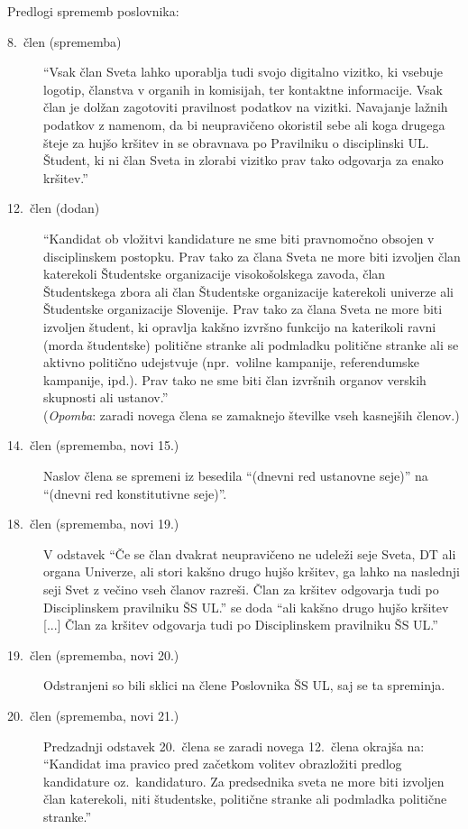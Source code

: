 \documentclass{seja}
\begin{document}
\begin{ad}
\item Predlogi sprememb poslovnika:
\begin{description}
  \item[8.~člen (sprememba)] ``Vsak član Sveta lahko uporablja tudi svojo
  digitalno vizitko, ki vsebuje logotip, članstva v organih in komisijah, ter
  kontaktne informacije. Vsak član je dolžan zagotoviti pravilnost podatkov na
  vizitki. Navajanje lažnih podatkov z namenom, da bi neupravičeno okoristil sebe
  ali koga drugega šteje za hujšo kršitev in se obravnava po Pravilniku o
  disciplinski UL. Študent, ki ni član Sveta in zlorabi vizitko prav tako
  odgovarja za enako kršitev.''
  \item[12.~člen (dodan)] ``Kandidat ob vložitvi kandidature ne sme biti pravnomočno
  obsojen v disciplinskem postopku. Prav tako za člana Sveta ne more biti izvoljen član
  katerekoli Študentske organizacije visokošolskega zavoda, član Študentskega
  zbora ali član Študentske organizacije katerekoli univerze ali Študentske
  organizacije Slovenije. Prav tako za člana Sveta ne more biti izvoljen študent,
  ki opravlja kakšno izvršno funkcijo na katerikoli ravni (morda študentske) politične
  stranke ali podmladku politične stranke ali se aktivno politično udejstvuje
  (npr.~volilne kampanije, referendumske kampanije, ipd.).
  Prav tako ne sme biti član izvršnih organov verskih skupnosti ali ustanov.'' \\
  (\emph{Opomba}: zaradi novega člena se zamaknejo številke vseh kasnejših členov.)
  \item[14.~člen (sprememba, novi 15.)] Naslov člena se spremeni iz besedila
  ``(dnevni red ustanovne seje)'' na ``(dnevni red konstitutivne seje)''.
  \item[18.~člen (sprememba, novi 19.)] V odstavek ``Če se član dvakrat
  neupravičeno ne udeleži seje Sveta, DT ali organa Univerze, ali stori kakšno
  drugo hujšo kršitev, ga lahko na naslednji seji Svet z večino vseh članov
  razreši. Član za kršitev odgovarja tudi po Disciplinskem pravilniku ŠS UL.'' se
  doda ``ali kakšno drugo hujšo kršitev [...] Član za kršitev odgovarja tudi po
  Disciplinskem pravilniku ŠS UL.''
  \item[19.~člen (sprememba, novi 20.)] Odstranjeni so bili sklici na člene
  Poslovnika ŠS UL, saj se ta spreminja.
  \item[20.~člen (sprememba, novi 21.)] Predzadnji odstavek 20.~člena se zaradi
  novega 12.~člena okrajša na: ``Kandidat ima pravico pred začetkom volitev
  obrazložiti predlog kandidature oz.~kandidaturo. Za predsednika sveta ne more
  biti izvoljen član katerekoli, niti študentske, politične stranke ali podmladka
  politične stranke.''
\end{description}


\end{ad}
\end{document}
